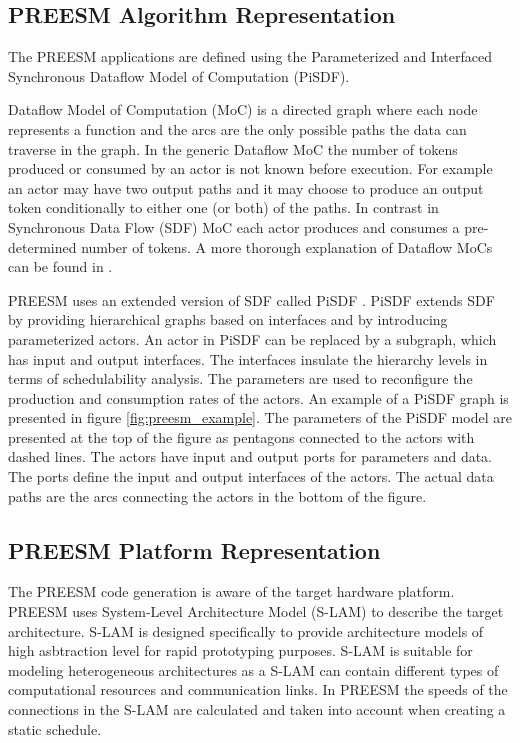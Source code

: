 \subsection{PREESM Algorithm Representation}
The PREESM applications are defined using the Parameterized and Interfaced
Synchronous Dataflow Model of Computation (PiSDF)\cite{pelcat2014preesm}.

Dataflow Model of Computation (MoC) is a directed graph where each node
represents a function and the arcs are the only possible paths the data can
traverse in the graph. In the generic Dataflow MoC the number of tokens produced
or consumed by an actor is not known before execution. For example an actor may
have two output paths and it may choose to produce an output token conditionally
to either one (or both) of the paths. In contrast in Synchronous Data Flow
(SDF) MoC each actor produces and consumes a pre-determined number of tokens.
\cite{lee1987synchronous} A more thorough explanation of Dataflow MoCs can be
found in \cite{lee2015introduction}.

PREESM uses an extended version of SDF called PiSDF \cite{pelcat2014preesm}.
PiSDF extends SDF by providing hierarchical graphs based on interfaces and by
introducing parameterized actors. An actor in PiSDF can be replaced by a
subgraph, which has input and output interfaces. The interfaces insulate the
hierarchy levels in terms of schedulability analysis. The parameters are used
to reconfigure the production and consumption rates of the actors.
\cite{desnos2013pimm} An example of a PiSDF graph is presented in figure
\ref{fig:preesm_example}. The parameters of the PiSDF model are presented at
the top of the figure as pentagons connected to the actors with dashed lines.
The actors have input and output ports for parameters and data. The ports
define the input and output interfaces of the actors. The actual data paths are
the arcs connecting the actors in the bottom of the figure.

\subsection{PREESM Platform Representation}
The PREESM code generation is aware of the target hardware platform. PREESM
uses System-Level Architecture Model (S-LAM) \cite{pelcat2009system} to
describe the target architecture. S-LAM is designed specifically to provide
architecture models of high asbtraction level for rapid prototyping purposes.
S-LAM is suitable for modeling heterogeneous architectures as a S-LAM can
contain different types of computational resources and communication links. In
PREESM the speeds of the connections in the S-LAM are calculated and taken into
account when creating a static schedule. \cite{pelcat2009system}

